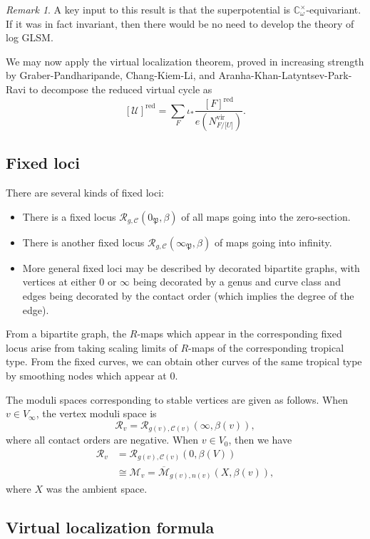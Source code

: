 \documentclass[10pt]{amsart}
\theoremstyle{definition}
\theoremstyle{remark}
\newtheorem{rmk}[thm]{Remark}
\theoremstyle{plain}
\theoremstyle{definition}
\theoremstyle{remark}
\newcommand{\C}{\mathbb{C}}
\newcommand{\Mbar}{\overline{\mathcal{M}}}
\newcommand{\mc}[1]{\mathcal{#1}}
\newcommand{\mf}[1]{\mathfrak{#1}}
\newcommand{\mr}[1]{\mathrm{#1}}
\newcommand{\1}{\mathbf{1}}
\newcommand{\2}{\mathbf{2}}
\newcommand{\3}{\mathbf{3}}
\newcommand{\vir}{\mr{vir}}
\newcommand{\red}{\mr{red}}
\begin{document}
\begin{rmk}
    A key input to this result is that the superpotential is $\C_{\omega}^{\times}$-equivariant. If it was in fact invariant, then there would be no need to develop the theory of log GLSM.
\end{rmk}

We may now apply the virtual localization theorem, proved in increasing strength by Graber-Pandharipande, Chang-Kiem-Li, and Aranha-Khan-Latyntsev-Park-Ravi to decompose the reduced virtual cycle as
\[ [\mc{U}]^{\red} = \sum_F \iota_* \frac{[F]^{\red}}{e(N_{F/\mc[U]}^{\vir})}. \]


\subsection{Fixed loci}%
\label{sub:Fixed loci}

There are several kinds of fixed loci:
\begin{itemize}
    \item There is a fixed locus $\mc{R}_{g,\mc{C}}(0_{\mf{P}}, \beta)$ of all maps going into the zero-section.
    \item There is another fixed locus $\mc{R}_{g,\mc{C}}(\infty_{\mf{P}}, \beta)$ of maps going into infinity.
    \item More general fixed loci may be described by decorated bipartite graphs, with vertices at either $0$ or $\infty$ being decorated by a genus and curve class and edges being decorated by the contact order (which implies the degree of the edge).
\end{itemize}
From a bipartite graph, the $R$-maps which appear in the corresponding fixed locus arise from taking scaling limits of $R$-maps of the corresponding tropical type. From the fixed curves, we can obtain other curves of the same tropical type by smoothing nodes which appear at $0$.

The moduli spaces corresponding to stable vertices are given as follows. When $v \in V_{\infty}$, the vertex moduli space is
\[ \mc{R}_v = \mc{R}_{g(v), \mc{C}(v)}(\infty, \beta(v)), \]
where all contact orders are negative. When $v \in V_0$, then we have
\begin{align*}
    \mc{R}_v &= \mc{R}_{g(v), \mc{C}(v)}(0, \beta(V)) \\
    &\cong \mc{M}_v = \Mbar_{g(v), n(v)} (X, \beta(v)),
\end{align*}
where $X$ was the ambient space.

\subsection{Virtual localization formula}%
\label{sub:Virtual localization formula}
\end{document}
